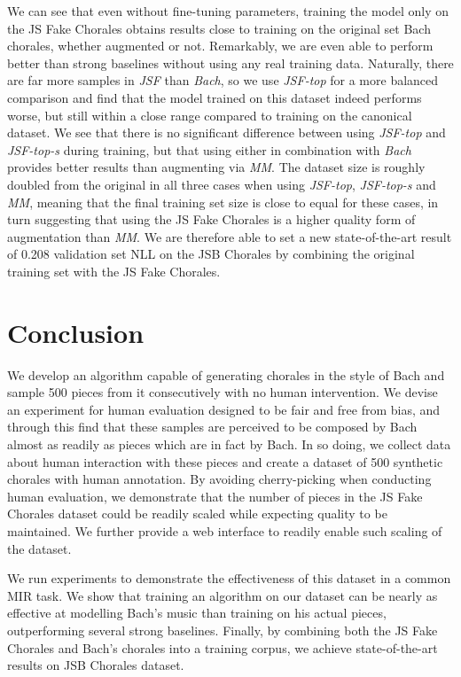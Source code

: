 \documentclass{article}
\begin{document}
We can see that even without fine-tuning parameters, training the model only on the JS Fake Chorales obtains results close to training on the original set Bach chorales, whether augmented or not. Remarkably, we are even able to perform better than strong baselines \cite{coconet, musictransformer} without using any real training data. Naturally, there are far more samples in \textit{JSF} than \textit{Bach}, so we use \textit{JSF-top} for a more balanced comparison and find that the model trained on this dataset indeed performs worse, but still within a close range compared to training on the canonical dataset. We see that there is no significant difference between using \textit{JSF-top} and \textit{JSF-top-s} during training, but that using either in combination with \textit{Bach} provides better results than augmenting via \textit{MM}. The dataset size is roughly doubled from the original in all three cases when using \textit{JSF-top}, \textit{JSF-top-s} and \textit{MM}, meaning that the final training set size is close to equal for these cases, in turn suggesting that using the JS Fake Chorales is a higher quality form of augmentation than \textit{MM}. We are therefore able to set a new state-of-the-art result of 0.208 validation set NLL on the JSB Chorales by combining the original training set with the JS Fake Chorales.

\section{Conclusion}

We develop an algorithm capable of generating chorales in the style of Bach and sample 500 pieces from it consecutively with no human intervention. We devise an experiment for human evaluation designed to be fair and free from bias, and through this find that these samples are perceived to be composed by Bach almost as readily as pieces which are in fact by Bach. In so doing, we collect data about human interaction with these pieces and create a dataset of 500 synthetic chorales with human annotation. By avoiding cherry-picking when conducting human evaluation, we demonstrate that the number of pieces in the JS Fake Chorales dataset could be readily scaled while expecting quality to be maintained. We further provide a web interface to readily enable such scaling of the dataset.

We run experiments to demonstrate the effectiveness of this dataset in a common MIR task. We show that training an algorithm on our dataset can be nearly as effective at modelling Bach's music than training on his actual pieces, outperforming several strong baselines. Finally, by combining both the JS Fake Chorales and Bach's chorales into a training corpus, we achieve state-of-the-art results on JSB Chorales dataset.
\end{document}
